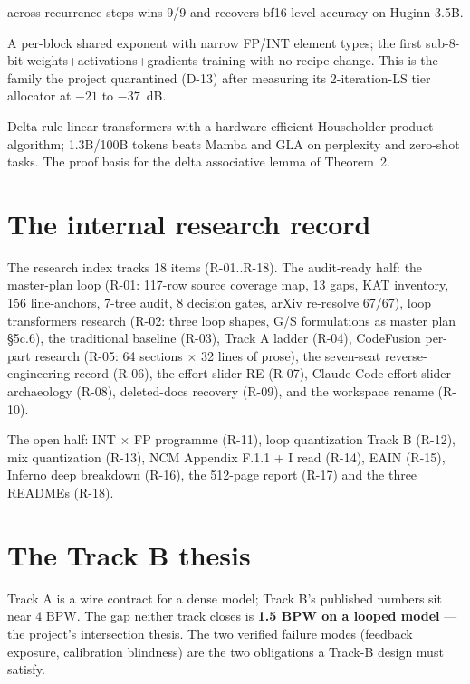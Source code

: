 \begin{description}
across recurrence steps wins 9/9 and recovers bf16-level accuracy on Huginn-3.5B.
\item[MX formats (2310.10537).] A per-block shared exponent with narrow FP/INT element types;
the first sub-8-bit weights+activations+gradients training with no recipe change. This is the
family the project quarantined (D-13) after measuring its 2-iteration-LS tier allocator at
$-21$ to $-37$~dB.
\item[DeltaNet (2406.06484).] Delta-rule linear transformers with a hardware-efficient
Householder-product algorithm; 1.3B/100B tokens beats Mamba and GLA on perplexity and
zero-shot tasks. The proof basis for the delta associative lemma of Theorem~2.
\end{description}

\section{The internal research record}

The research index tracks 18 items (R-01..R-18). The audit-ready half: the master-plan loop
(R-01: 117-row source coverage map, 13 gaps, KAT inventory, 156 line-anchors, 7-tree audit,
8 decision gates, arXiv re-resolve 67/67), loop transformers research (R-02: three loop shapes,
G/S formulations as master plan §5c.6), the traditional baseline (R-03), Track A ladder (R-04),
CodeFusion per-part research (R-05: 64 sections $\times$ 32 lines of prose), the seven-seat
reverse-engineering record (R-06), the effort-slider RE (R-07), Claude Code effort-slider
archaeology (R-08), deleted-docs recovery (R-09), and the workspace rename (R-10).

The open half: INT $\times$ FP programme (R-11), loop quantization Track B (R-12), mix
quantization (R-13), NCM Appendix F.1.1 + I read (R-14), EAIN (R-15), Inferno deep breakdown
(R-16), the 512-page report (R-17) and the three READMEs (R-18).

\section{The Track B thesis}

Track A is a wire contract for a dense model; Track B's published numbers sit near 4 BPW. The
gap neither track closes is \textbf{1.5 BPW on a looped model} --- the project's intersection
thesis. The two verified failure modes (feedback exposure, calibration blindness) are the two
obligations a Track-B design must satisfy.
